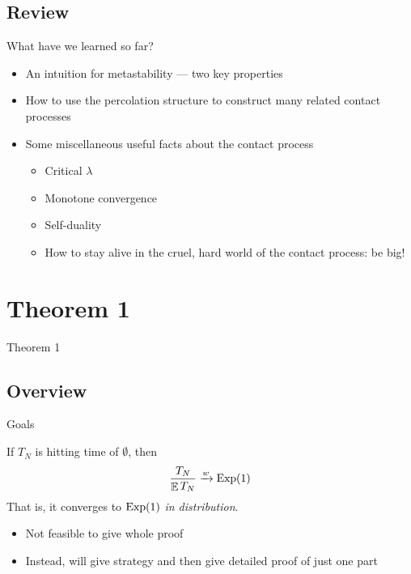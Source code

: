 \documentclass{beamer}
\begin{document}
\subsection{Review}

\begin{frame}
  What have we learned so far?
  \begin{itemize}
    \item An intuition for metastability --- two key properties
          \pause
    \item How to use the percolation structure to construct many related contact processes
          \pause
    \item Some miscellaneous useful facts about the contact process
          \pause
          \begin{itemize}
            \item Critical $\lambda$
                  \pause
            \item Monotone convergence
                  \pause
            \item Self-duality
                  \pause
            \item How to stay alive in the cruel, hard world of the contact process: be big!
          \end{itemize}
  \end{itemize}
\end{frame}

\section{Theorem 1}

\begin{frame}{Theorem 1}
  \tableofcontents[currentsection]
\end{frame}

\subsection{Overview}

\begin{frame}{Goals}
  \begin{theorem}
    If $T_{N}$ is hitting time of $\emptyset$, then
    \[ \frac{T_{N}}{\E T_{N}} \to[w] \expDist(1) \]
    That is, it converges to $\expDist(1)$ \emph{in distribution}.
  \end{theorem}
  \pause
  \begin{itemize}
    \item Not feasible to give whole proof
          \pause
    \item Instead, will give strategy and then give detailed proof of just one part
  \end{itemize}
\end{frame}
\end{document}

